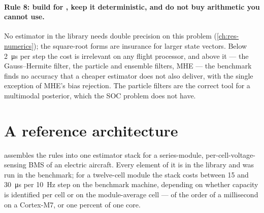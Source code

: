 \paragraph{Rule 8: build for , keep it deterministic, and do not buy arithmetic
you cannot use.} No estimator in the library needs double precision on this problem
(\cref{ch:res-numerics}); the square-root forms are insurance for larger state vectors. Below
\SI{2}{\micro\second} per step the cost is irrelevant on any flight processor, and above it
--- the Gauss--Hermite filter, the particle and ensemble filters, MHE --- the benchmark finds no
accuracy that a cheaper estimator does not also deliver, with the single exception of MHE's
bias rejection. The particle filters are the correct tool for a multimodal posterior, which
the SOC problem does not have.

\section{A reference architecture}

 assembles the rules into one estimator stack for a series-module,
per-cell-voltage-sensing BMS of an electric aircraft. Every element of it is in the library and was
run in the benchmark; for a twelve-cell module the stack costs between \SI{15}{} and
\SI{30}{\micro\second} per \SI{10}{\hertz} step on the benchmark machine, depending on
whether capacity is identified per cell or on the module-average cell --- of the order of a
millisecond on a Cortex-M7, or one percent of one core.

